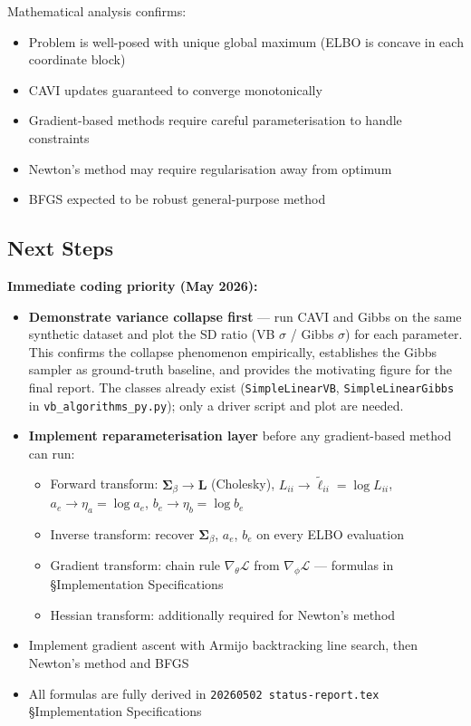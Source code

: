 \documentclass[11pt]{article}
\begin{document}
Mathematical analysis confirms:
\begin{itemize}
\item Problem is well-posed with unique global maximum (ELBO is concave in each coordinate block)
\item CAVI updates guaranteed to converge monotonically
\item Gradient-based methods require careful parameterisation to handle constraints
\item Newton's method may require regularisation away from optimum
\item BFGS expected to be robust general-purpose method
\end{itemize}

\newpage
\subsection*{Next Steps}

\textbf{Immediate coding priority (May 2026):}
\begin{itemize}
  \item[\textbf{!}] \textbf{Demonstrate variance collapse first} --- run CAVI and Gibbs on the same synthetic dataset and plot the SD ratio (VB $\sigma$ / Gibbs $\sigma$) for each parameter. This confirms the collapse phenomenon empirically, establishes the Gibbs sampler as ground-truth baseline, and provides the motivating figure for the final report. The classes already exist (\texttt{SimpleLinearVB}, \texttt{SimpleLinearGibbs} in \texttt{vb\_algorithms\_py.py}); only a driver script and plot are needed.
  \item[\textbf{!}] \textbf{Implement reparameterisation layer} before any gradient-based method can run:
  \begin{itemize}
    \item Forward transform: $\bm{\Sigma}_\beta \to \bm{L}$ (Cholesky), $L_{ii} \to \tilde\ell_{ii} = \log L_{ii}$, $a_e \to \eta_a = \log a_e$, $b_e \to \eta_b = \log b_e$
    \item Inverse transform: recover $\bm{\Sigma}_\beta$, $a_e$, $b_e$ on every ELBO evaluation
    \item Gradient transform: chain rule $\nabla_\theta \mathcal{L}$ from $\nabla_\phi \mathcal{L}$ --- formulas in \S Implementation Specifications
    \item Hessian transform: additionally required for Newton's method
  \end{itemize}
  \item Implement gradient ascent with Armijo backtracking line search, then Newton's method and BFGS
  \item All formulas are fully derived in \texttt{20260502 status-report.tex} \S Implementation Specifications
\end{itemize}
\end{document}
